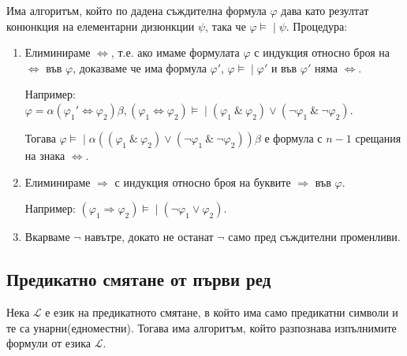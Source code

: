 \documentclass{article}
\newcommand{\mymod}{\models\!\mid}
\begin{document}
\begin{thm}
\begin{conseq}
\end{conseq}
\end{thm}


\begin{thm}
Има алгоритъм, който по дадена съждителна формула $\varphi$ дава като резултат конюнкция на елементарни дизюнкции $\psi$, така че $\varphi \mymod \psi$. Процедура:
\begin{enumerate}
\item Елиминираме $\Leftrightarrow$, т.е. ако имаме формулата $\varphi$ с индукция относно броя на $\Leftrightarrow$ във $\varphi$, доказваме че има формула $\varphi'$, $\varphi \mymod \varphi'$ и във $\varphi'$ няма $\Leftrightarrow$.

Например: $\varphi = \alpha(\varphi_1' \Leftrightarrow \varphi_2)\beta, (\varphi_1 \Leftrightarrow \varphi_2) \mymod (\varphi_1\ \&\ \varphi_2) \lor (\neg\varphi_1\ \&\ \neg\varphi_2)$. 

Тогава $\varphi \mymod \alpha((\varphi_1\ \&\ \varphi_2) \lor (\neg\varphi_1\ \&\ \neg\varphi_2))\beta$ е формула с $n - 1$ срещания на знака $\Leftrightarrow$.

\item Елиминираме $\Rightarrow$ с индукция относно броя на буквите $\Rightarrow$ във $\varphi$.

Например: $(\varphi_1 \Rightarrow \varphi_2) \mymod (\neg\varphi_1 \lor \varphi_2)$.

\item Вкарваме $\neg$ навътре, докато не останат $\neg$ само пред съждителни променливи.
\end{enumerate}

\end{thm}


\subsection*{Предикатно смятане от първи ред}

\begin{thm}
Нека $\mathcal{L}$ е език на предикатното смятане, в който има само предикатни символи и те са унарни(едноместни). Тогава има алгоритъм, който разпознава изпълнимите формули от езика $\mathcal{L}$.
\end{thm}
\end{document}
